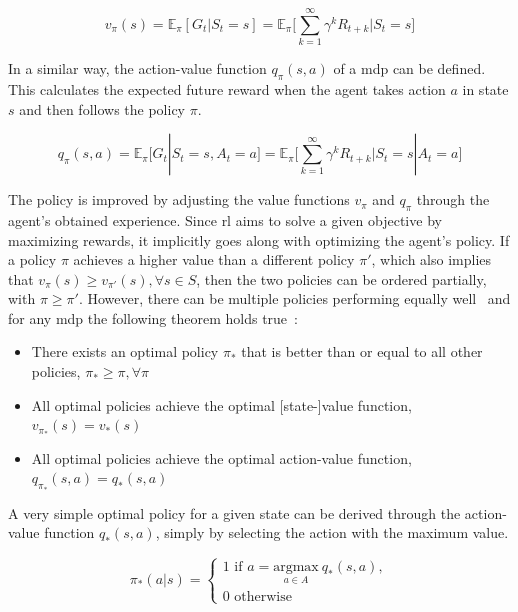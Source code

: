 \documentclass[draft,final]{vutinfth} %
\newcommand{\p}[1]{see p. #1}
\begin{document}
    \begin{equation}
        v_\pi(s) = \mathbb{E}_\pi[G_t|S_t = s] = \mathbb{E}_\pi \Bigg[\sum_{k=1}^{\infty} \gamma^k R_{t+k} \bigg| S_t = s \Bigg]\label{eq:value_function}
    \end{equation}

    In a similar way, the action-value function $q_\pi(s,a)$ of a \gls{mdp} can be defined.
    This calculates the expected future reward when the agent takes action $a$ in state $s$ and then follows the policy $\pi$.

    \begin{equation}
        q_\pi(s,a) = \mathbb{E}_\pi[G_t|S_t = s, A_t = a] = \mathbb{E}_\pi \Bigg[\sum_{k=1}^{\infty} \gamma^k R_{t+k} \bigg| S_t = s | A_t = a \Bigg]\label{eq:quality_function}
    \end{equation}

    The policy is improved by adjusting the value functions $v_\pi$ and $q_\pi$ through the agent's obtained experience.
    Since \gls{rl} aims to solve a given objective by maximizing rewards, it implicitly goes along with optimizing the agent's policy.
    If a policy $\pi$ achieves a higher value than a different policy $\pi'$, which also implies that $v_\pi(s) \geq v_{\pi'}(s), \forall s \in \mathit{S}$, then the two policies can be ordered partially, with $\pi \geq \pi'$.
    However, there can be multiple policies performing equally well~\citep{sutton_reinforcement_2018} and for any \gls{mdp} the following theorem holds true~\citep[\p{43}]{silver_lecture_2015-1}:

    \begin{itemize}
        \item There exists an optimal policy $\pi_*$ that is better than or equal to all other policies, $\pi_* \geq \pi, \forall\pi$
        \item All optimal policies achieve the optimal [state-]value function, $v_{\pi_*}(s) = v_*(s)$
        \item All optimal policies achieve the optimal action-value function, $q_{\pi_*}(s,a) = q_*(s,a)$
    \end{itemize}

    A very simple optimal policy for a given state can be derived through the action-value function $q_*(s,a)$, simply by selecting the action with the maximum value.

    \begin{equation}
        \pi_*(a|s) =
        \begin{cases}
            1 \text{ if } a =  \underset{a \in \mathit{A}}{\text{argmax}}\ q_*(s,a),\\
            0 \text{ otherwise }
        \end{cases}
    \end{equation}
\end{document}

